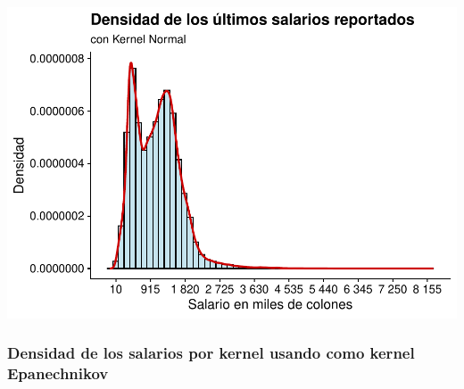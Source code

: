 \documentclass[
]{article}
\begin{document}
\includegraphics{mientras_files/figure-latex/unnamed-chunk-14-1.pdf}

\hypertarget{densidad-de-los-salarios-por-kernel-usando-como-kernel-epanechnikov}{%
\subsubsection{Densidad de los salarios por kernel usando como kernel
Epanechnikov}\label{densidad-de-los-salarios-por-kernel-usando-como-kernel-epanechnikov}}
\end{document}
